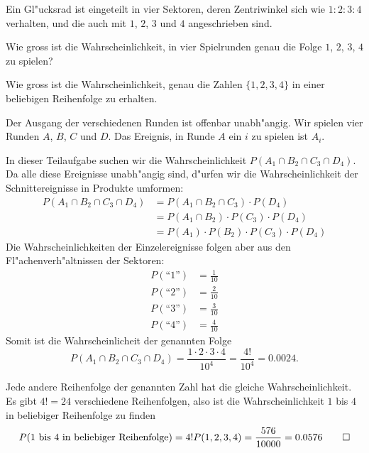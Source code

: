 Ein Gl"ucksrad ist eingeteilt in vier Sektoren, deren Zentriwinkel
sich wie $1:2:3:4$ verhalten, und die auch mit $1$, $2$, $3$ und $4$
angeschrieben sind.
\begin{teilaufgaben}
\item Wie gross ist die Wahrscheinlichkeit, in vier Spielrunden genau die
Folge $1$, $2$, $3$, $4$ zu spielen?
\item Wie gross ist die Wahrscheinlichkeit, genau die Zahlen $\{1,2,3,4\}$
in einer beliebigen Reihenfolge zu erhalten.
\end{teilaufgaben}

\begin{loesung}
Der Ausgang der verschiedenen Runden ist offenbar unabh"angig.
Wir spielen vier Runden $A$, $B$, $C$ und $D$. Das Ereignis, in
Runde $A$ ein $i$ zu spielen ist $A_i$.

\begin{teilaufgaben}
\item
In dieser Teilaufgabe suchen wir die Wahrscheinlichkeit
$P(A_1\cap B_2\cap C_3\cap D_4)$. Da alle diese Ereignisse
unabh"angig sind, d"urfen wir die Wahrscheinlichkeit der
Schnittereignisse in Produkte umformen:
\begin{align*}
P(A_1\cap B_2\cap C_3\cap D_4)
&=
P(A_1\cap B_2\cap C_3)\cdot P(D_4)
\\
&=
P(A_1\cap B_2)\cdot P(C_3)\cdot P(D_4)
\\
&=
P(A_1)\cdot P(B_2)\cdot P(C_3)\cdot P(D_4)
\end{align*}
Die Wahrscheinlichkeiten der Einzelereignisse folgen aber aus den
Fl"achenverh"altnissen der Sektoren:
\begin{align*}
P(\text{``1''})&=\frac1{10}\\
P(\text{``2''})&=\frac2{10}\\
P(\text{``3''})&=\frac3{10}\\
P(\text{``4''})&=\frac4{10}
\end{align*}
Somit ist die Wahrscheinlicheit der genannten Folge
\[
P(A_1\cap B_2\cap C_3\cap D_4)
=\frac{1\cdot2\cdot 3\cdot 4}{10^4}=\frac{4!}{10^4}=0.0024.
\]
\item Jede andere Reihenfolge der genannten Zahl hat die gleiche
Wahrscheinlichkeit. Es gibt $4!=24$ verschiedene Reihenfolgen, also
ist die Wahrscheinlichkeit $1$ bis $4$ in beliebiger Reihenfolge
zu finden
\[
P(\text{$1$ bis $4$ in beliebiger Reihenfolge})=4!P(1,2,3,4)=
\frac{576}{10000}=0.0576
\qedhere
\]
\end{teilaufgaben}
\end{loesung}

